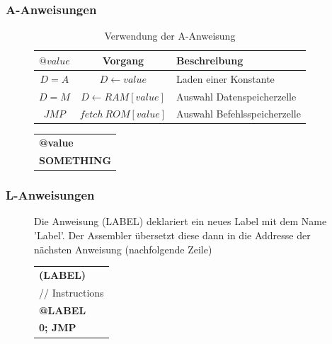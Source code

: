 \documentclass[12pt]{report}
\begin{document}
\subsubsection{A-Anweisungen}
\begin{figure}[H]
  \begin{minipage}[t]{0.65\textwidth}
    \centering
    \begin{table}[H]
      \caption*{Verwendung der A-Anweisung}
      \begin{tabular}{|c|c|l|}
        \hline
        $@value$ & Vorgang                   & Beschreibung                 \\\hline
        $D=A$    & $D \leftarrow value$      & Laden einer Konstante        \\
        $D=M$    & $D \leftarrow RAM[value]$ & Auswahl Datenspeicherzelle   \\
        $JMP$    & $fetch\ ROM[value]$       & Auswahl Befehlsspeicherzelle \\ \hline
      \end{tabular}
    \end{table}
  \end{minipage}
  \hfill
  \begin{minipage}[t]{0.3\textwidth}
    \centering
    \begin{table}[H]
      \begin{tabular}{l}
        \textbf{@value} \\
        \textbf{SOMETHING}
      \end{tabular}
    \end{table}
  \end{minipage}
\end{figure}


\subsubsection{L-Anweisungen}

\begin{figure}[H]
  \begin{minipage}[t]{0.45\textwidth}
    Die Anweisung (LABEL) deklariert ein neues Label mit dem Name 'Label'. Der Assembler
    übersetzt diese dann in die Addresse der nächsten Anweisung (nachfolgende Zeile)
  \end{minipage}
  \hfill
  \begin{minipage}[t]{0.45\textwidth}
    \centering
    \begin{tabular}{l}
      \textbf{(LABEL)}              \\
      \hspace{10pt} // Instructions \\
      \hspace{10pt}\textbf{@LABEL}  \\
      \hspace{10pt}\textbf{0; JMP}
    \end{tabular}
  \end{minipage}
\end{figure}
\end{document}
